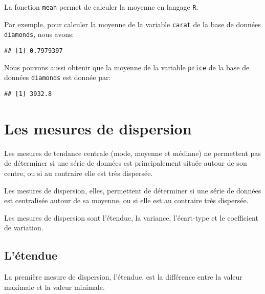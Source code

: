 \documentclass[]{book}
\newenvironment{Shaded}{\begin{snugshade}}{\end{snugshade}}
\newcommand{\KeywordTok}[1]{\textcolor[rgb]{0.13,0.29,0.53}{\textbf{#1}}}
\newcommand{\OperatorTok}[1]{\textcolor[rgb]{0.81,0.36,0.00}{\textbf{#1}}}
\newcommand{\NormalTok}[1]{#1}
\begin{document}
La fonction \texttt{mean} permet de calculer la moyenne en langage
\texttt{R}.

Par exemple, pour calculer la moyenne de la variable \texttt{carat} de
la base de données \texttt{diamonds}, nous avons:

\begin{Shaded}
\end{Shaded}

\begin{verbatim}
## [1] 0.7979397
\end{verbatim}

Nous pouvons aussi obtenir que la moyenne de la variable \texttt{price}
de la base de données \texttt{diamonds} est donnée par:

\begin{Shaded}
\end{Shaded}

\begin{verbatim}
## [1] 3932.8
\end{verbatim}

\section{Les mesures de dispersion}\label{les-mesures-de-dispersion}

Les mesures de tendance centrale (mode, moyenne et médiane) ne
permettent pas de déterminer si une série de données est principalement
située autour de son centre, ou si au contraire elle est très dispersée.

Les mesures de dispersion, elles, permettent de déterminer si une série
de données est centralisée autour de sa moyenne, ou si elle est au
contraire très dispersée.

Les mesures de dispersion sont l'étendue, la variance, l'écart-type et
le coefficient de variation.

\subsection{L'étendue}\label{letendue}

La première mesure de dispersion, l'étendue, est la différence entre la
valeur maximale et la valeur minimale.
\end{document}
